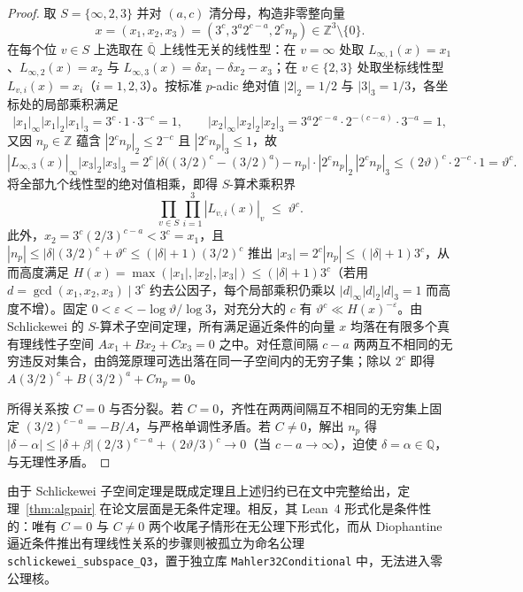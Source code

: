 \documentclass[11pt,a4paper]{article}
\theoremstyle{remark}
\newcommand{\Q}{\mathbb{Q}}
\newcommand{\Z}{\mathbb{Z}}
\begin{document}
\begin{proof}
取 $S = \{\infty, 2, 3\}$ 并对 $(a,c)$ 清分母，构造非零整向量
\[
  x = (x_{1},x_{2},x_{3}) = (3^{c}, 3^{a} 2^{c-a}, 2^{c} n_{p}) \in \Z^{3} \setminus \{0\}.
\]
在每个位 $v \in S$ 上选取在 $\overline{\Q}$ 上线性无关的线性型：在 $v = \infty$ 处取 $L_{\infty,1}(x) = x_{1}$、$L_{\infty,2}(x) = x_{2}$ 与 $L_{\infty,3}(x) = \delta x_{1} - \delta x_{2} - x_{3}$；在 $v \in \{2,3\}$ 处取坐标线性型 $L_{v,i}(x) = x_{i}$（$i = 1,2,3$）。按标准 $p$-adic 绝对值 $|2|_{2} = 1/2$ 与 $|3|_{3} = 1/3$，各坐标处的局部乘积满足
\[
  |x_{1}|_{\infty} |x_{1}|_{2} |x_{1}|_{3} = 3^{c} \cdot 1 \cdot 3^{-c} = 1,
  \qquad
  |x_{2}|_{\infty} |x_{2}|_{2} |x_{2}|_{3} = 3^{a} 2^{c-a} \cdot 2^{-(c-a)} \cdot 3^{-a} = 1,
\]
又因 $n_{p} \in \Z$ 蕴含 $|2^{c} n_{p}|_{2} \le 2^{-c}$ 且 $|2^{c} n_{p}|_{3} \le 1$，故
\[
  |L_{\infty,3}(x)|_{\infty} |x_{3}|_{2} |x_{3}|_{3}
  = 2^{c}\,\bigl|\delta\bigl((3/2)^{c} - (3/2)^{a}\bigr) - n_{p}\bigr|\cdot |2^{c} n_{p}|_{2}\, |2^{c} n_{p}|_{3}
  \le (2\vartheta)^{c} \cdot 2^{-c} \cdot 1 = \vartheta^{c}.
\]
将全部九个线性型的绝对值相乘，即得 $S$-算术乘积界
\[
  \prod_{v \in S} \prod_{i=1}^{3} |L_{v,i}(x)|_{v} \;\le\; \vartheta^{c}.
\]
此外，$x_{2} = 3^{c}(2/3)^{c-a} < 3^{c} = x_{1}$，且 $|n_{p}| \le |\delta|(3/2)^{c} + \vartheta^{c} \le (|\delta|+1)(3/2)^{c}$ 推出 $|x_{3}| = 2^{c}|n_{p}| \le (|\delta|+1)3^{c}$，从而高度满足 $H(x) = \max(|x_{1}|,|x_{2}|,|x_{3}|) \le (|\delta|+1)3^{c}$（若用 $d = \gcd(x_{1},x_{2},x_{3}) \mid 3^{c}$ 约去公因子，每个局部乘积仍乘以 $|d|_{\infty}|d|_{2}|d|_{3}=1$ 而高度不增）。固定 $0 < \varepsilon < -\log\vartheta / \log 3$，对充分大的 $c$ 有 $\vartheta^{c} \ll H(x)^{-\varepsilon}$。由 Schlickewei 的 $S$-算术子空间定理，所有满足逼近条件的向量 $x$ 均落在有限多个真有理线性子空间 $A x_{1} + B x_{2} + C x_{3} = 0$ 之中。对任意间隔 $c - a$ 两两互不相同的无穷违反对集合，由鸽笼原理可选出落在同一子空间内的无穷子集；除以 $2^{c}$ 即得 $A(3/2)^{c} + B(3/2)^{a} + C n_{p} = 0$。

所得关系按 $C = 0$ 与否分裂。若 $C = 0$，齐性在两两间隔互不相同的无穷集上固定 $(3/2)^{c-a} = -B/A$，与严格单调性矛盾。若 $C \neq 0$，解出 $n_{p}$ 得 $|\delta - \alpha| \le |\delta + \beta|(2/3)^{c-a} + (2\vartheta/3)^{c} \to 0$（当 $c - a \to \infty$），迫使 $\delta = \alpha \in \Q$，与无理性矛盾。
\end{proof}

由于 Schlickewei 子空间定理是既成定理且上述归约已在文中完整给出，定理~\ref{thm:algpair} 在论文层面是无条件定理。相反，其 Lean~4 形式化是条件性的：唯有 $C = 0$ 与 $C \neq 0$ 两个收尾子情形在无公理下形式化，而从 Diophantine 逼近条件推出有理线性关系的步骤则被孤立为命名公理 \texttt{schlickewei\_subspace\_Q3}，置于独立库 \texttt{Mahler32Conditional} 中，无法进入零公理核。
\end{document}
